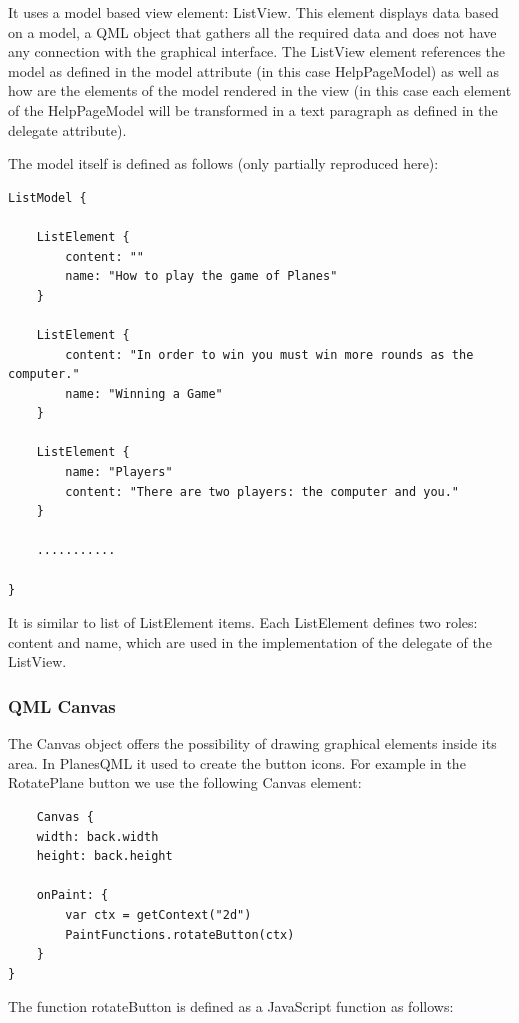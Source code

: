 It uses a model based view element: ListView. This element displays data based on a model, a QML object that gathers all the required data and does not have any connection with the graphical interface. The ListView element references the model as defined in the model attribute (in this case HelpPageModel) as well as how are the elements of the model rendered in the view (in this case each element of the HelpPageModel will be transformed in a text paragraph as defined in the delegate attribute).

The model itself is defined as follows (only partially reproduced here):

\begin{lstlisting}
ListModel {

	ListElement {
		content: ""
		name: "How to play the game of Planes"
	}
	
	ListElement {
		content: "In order to win you must win more rounds as the computer."
		name: "Winning a Game"
	}
	
	ListElement {
		name: "Players"
		content: "There are two players: the computer and you."
	}
	
	...........
	
}
\end{lstlisting}

It is similar to list of ListElement items. Each ListElement defines two roles: content and name, which are used in the implementation of the delegate of the ListView.

\subsubsection {QML Canvas}


The Canvas object offers the possibility of drawing graphical elements inside its area. In PlanesQML it used to create the button icons. For example in the RotatePlane button we use the following Canvas element:

\begin{lstlisting}
    Canvas {
	width: back.width
	height: back.height
	
	onPaint: {
		var ctx = getContext("2d")
		PaintFunctions.rotateButton(ctx)
	}
}
\end{lstlisting}

The function rotateButton is defined as a JavaScript function as follows:

